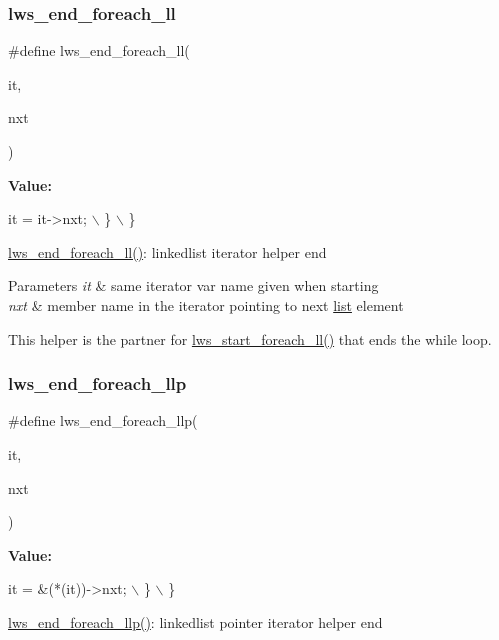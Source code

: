 \subsubsection{\texorpdfstring{lws\+\_\+end\+\_\+foreach\+\_\+ll}{lws\_end\_foreach\_ll}\hspace{0.1cm}{\footnotesize\ttfamily [6/6]}}
{\footnotesize\ttfamily \#define lws\+\_\+end\+\_\+foreach\+\_\+ll(\begin{DoxyParamCaption}\item[{}]{it,  }\item[{}]{nxt }\end{DoxyParamCaption})}

{\bfseries Value\+:}
\begin{DoxyCode}
it = it->nxt; \(\backslash\)
    \} \(\backslash\)
\}
\end{DoxyCode}
\hyperlink{group__misc_ga9d94995ca7a1be16bf3d7bd2e449c812}{lws\+\_\+end\+\_\+foreach\+\_\+ll()}\+: linkedlist iterator helper end


\begin{DoxyParams}{Parameters}
{\em it} & same iterator var name given when starting \\
\hline
{\em nxt} & member name in the iterator pointing to next \hyperlink{protocollist-p}{list} element\\
\hline
\end{DoxyParams}
This helper is the partner for \hyperlink{group__misc_ga9f138b98c73782807d88e76c1c532dc2}{lws\+\_\+start\+\_\+foreach\+\_\+ll()} that ends the while loop. \mbox{\label{group__misc_gaba92c53b57f3e689f8568b02184a8d84}} 
\subsubsection{\texorpdfstring{lws\+\_\+end\+\_\+foreach\+\_\+llp}{lws\_end\_foreach\_llp}\hspace{0.1cm}{\footnotesize\ttfamily [1/6]}}
{\footnotesize\ttfamily \#define lws\+\_\+end\+\_\+foreach\+\_\+llp(\begin{DoxyParamCaption}\item[{}]{it,  }\item[{}]{nxt }\end{DoxyParamCaption})}

{\bfseries Value\+:}
\begin{DoxyCode}
it = &(*(it))->nxt; \(\backslash\)
    \} \(\backslash\)
\}
\end{DoxyCode}
\hyperlink{group__misc_gaba92c53b57f3e689f8568b02184a8d84}{lws\+\_\+end\+\_\+foreach\+\_\+llp()}\+: linkedlist pointer iterator helper end


